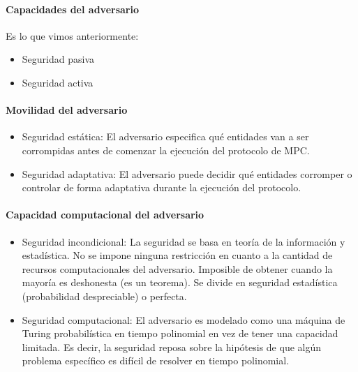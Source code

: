   \paragraph{Capacidades del adversario}
  Es lo que vimos anteriormente:
  \begin{itemize}
    \item Seguridad pasiva 
    \item Seguridad activa
  \end{itemize}

  \paragraph{Movilidad del adversario}
  \begin{itemize}
    \item Seguridad estática: El adversario especifica qué entidades van a ser corrompidas antes de comenzar 
      la ejecución del protocolo de MPC.
    \item Seguridad adaptativa: El adversario puede decidir qué entidades corromper o controlar de forma adaptativa 
      durante la ejecución del protocolo.
  \end{itemize}

  \paragraph{Capacidad computacional del adversario}
  \begin{itemize}
    \item Seguridad incondicional: La seguridad se basa en teoría de la información y estadística.
      No se impone ninguna restricción en cuanto a la cantidad de recursos computacionales del adversario.
      Imposible de obtener cuando la mayoría es deshonesta (es un teorema).
      Se divide en seguridad estadística (probabilidad despreciable) o perfecta.
    \item Seguridad computacional: El adversario es modelado como una máquina de Turing probabilística en tiempo polinomial
      en vez de tener una capacidad limitada. Es decir, la seguridad reposa sobre la hipótesis de que algún problema 
      específico es difícil de resolver en tiempo polinomial.
  \end{itemize}

